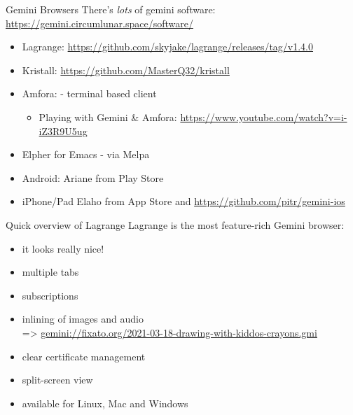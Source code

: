 \documentclass[presentation, 11pt,  aspectratio=169]{beamer}
\begin{document}
\begin{frame}[label={sec:org44a48e1}]{Gemini Browsers}
There's \emph{lots} of gemini software: \url{https://gemini.circumlunar.space/software/}\\

\begin{itemize}
\item \alert{Lagrange:} \url{https://github.com/skyjake/lagrange/releases/tag/v1.4.0}\\
\item \alert{Kristall:} \url{https://github.com/MasterQ32/kristall}\\
\item \alert{Amfora:} - terminal based client\\
\begin{itemize}
\item Playing with Gemini \& Amfora: \url{https://www.youtube.com/watch?v=i-iZ3R9U5ug}\\
\end{itemize}
\item \alert{Elpher} for Emacs - via Melpa\\
\item \alert{Android:} Ariane from Play Store\\
\item \alert{iPhone/Pad} Elaho from App Store and \url{https://github.com/pitr/gemini-ios}\\
\end{itemize}
\end{frame}

\begin{frame}[label={sec:orgbd0c8e6}]{Quick overview of Lagrange}
Lagrange is the most feature-rich Gemini browser:\\
\begin{itemize}
\item it looks really nice!\\
\item multiple tabs\\
\item subscriptions\\
\item inlining of images and audio\\
=> \href{gemini://fixato.org/2021-03-18-drawing-with-kiddos-crayons.gmi}{gemini://fixato.org/2021-03-18-drawing-with-kiddos-crayons.gmi}\\
\item clear certificate management\\
\item split-screen view\\
\item available for Linux, Mac and Windows\\
\end{itemize}
\end{frame}
\end{document}
